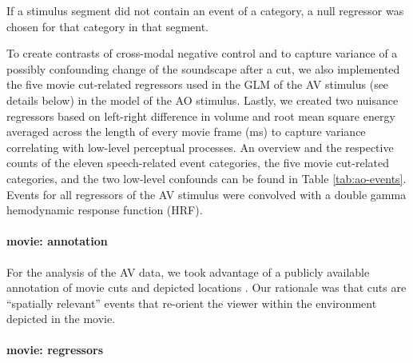 \documentclass[english]{article}
\begin{document}
If a stimulus segment did not contain an event of a category, a null regressor
was chosen for that category in that segment.

To create contrasts of cross-modal negative control and to capture variance of a
possibly confounding change of the soundscape after a cut, we also implemented
the five movie cut-related regressors used in the GLM of the AV stimulus (see
details below) in the model of the AO stimulus.
%
Lastly, we created two nuisance regressors based on left-right difference in
volume and root mean square energy averaged across the length of every movie
frame (\unit[40]{ms}) to capture variance correlating with low-level perceptual
processes.
An overview and the respective counts of the eleven speech-related event
categories, the five movie cut-related categories, and the two low-level
confounds can be found in Table \ref{tab:ao-events}.
Events for all regressors of the AV stimulus were convolved with a
double gamma hemodynamic response function (HRF).




\paragraph{movie: annotation}

For the analysis of the AV data, we took advantage of a publicly available
annotation of movie cuts and depicted locations \citep{haeusler2016cutanno}.
Our rationale was that cuts are ``spatially relevant'' events that re-orient the
viewer within the environment depicted in the movie.



\paragraph{movie: regressors}
\end{document}
